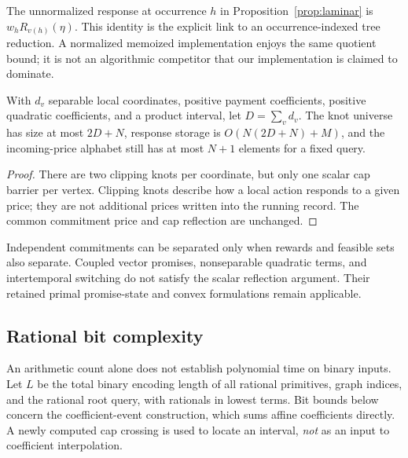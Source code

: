 The unnormalized response at occurrence $h$ in Proposition~\ref{prop:laminar} is $w_hR_{v(h)}(\eta)$. This identity is the explicit link to an occurrence-indexed tree reduction. A normalized memoized implementation enjoys the same quotient bound; it is not an algorithmic competitor that our implementation is claimed to dominate.

\begin{corollary}\label{cor:coordinates}
With $d_v$ separable local coordinates, positive payment coefficients, positive quadratic coefficients, and a product interval, let $D=\sum_vd_v$. The knot universe has size at most $2D+N$, response storage is $O(N(2D+N)+M)$, and the incoming-price alphabet still has at most $N+1$ elements for a fixed query.
\end{corollary}
\begin{proof}
There are two clipping knots per coordinate, but only one scalar cap barrier per vertex. Clipping knots describe how a local action responds to a given price; they are not additional prices written into the running record. The common commitment price and cap reflection are unchanged.\end{proof}
Independent commitments can be separated only when rewards and feasible sets also separate. Coupled vector promises, nonseparable quadratic terms, and intertemporal switching do not satisfy the scalar reflection argument. Their retained primal promise-state and convex formulations remain applicable.

\subsection{Rational bit complexity}\label{sec:bit}
An arithmetic count alone does not establish polynomial time on binary inputs. Let $L$ be the total binary encoding length of all rational primitives, graph indices, and the rational root query, with rationals in lowest terms. Bit bounds below concern the coefficient-event construction, which sums affine coefficients directly. A newly computed cap crossing is used to locate an interval, \emph{not} as an input to coefficient interpolation.

